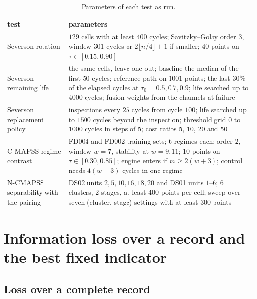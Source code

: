 \documentclass[12pt]{article}
\begin{document}
\begin{table}[tb]
\caption{Parameters of each test as run.}
\label{tab:params}
\centering
\footnotesize
\setlength{\tabcolsep}{3pt}
\begin{tabular}{@{}>{\raggedright\arraybackslash}p{}
                  >{\raggedright\arraybackslash}p{}@{}}
\hline
test & parameters\\
\hline
Severson rotation & $129$ cells with at least $400$ cycles; Savitzky--Golay
order $3$, window $301$ cycles or $2\lfloor n/4\rfloor+1$ if smaller; $40$
points on $\tau\in[0.15,0.90]$\\[2pt]
Severson remaining life & the same cells, leave-one-out; baseline the median
of the first $50$ cycles; reference path on $1001$ points; the last $30\%$ of
the elapsed cycles at $\tau_0=0.5,0.7,0.9$; life searched up to $4000$
cycles; fusion weights from the channels at failure\\[2pt]
Severson replacement policy & inspections every $25$ cycles from cycle $100$;
life searched up to $1500$ cycles beyond the inspection; threshold grid $0$
to $1000$ cycles in steps of $5$; cost ratios $5$, $10$, $20$ and $50$\\[2pt]
C-MAPSS regime contrast & FD004 and FD002 training sets; $6$ regimes each; order
$2$, window $w=7$, stability at $w=9,11$; $10$ points on
$\tau\in[0.30,0.85]$; engine enters if $m\ge2(w+3)$; control needs
$4(w+3)$ cycles in one regime\\[2pt]
N-CMAPSS separability with the pairing & DS02 units $2,5,10,16,18,20$ and DS01 units $1$--$6$;
$6$ clusters, $2$ stages, at least $400$ points per cell; sweep over seven
(cluster, stage) settings with at least $300$ points\\
\hline
\end{tabular}
\end{table}

\section{Information loss over a record and the best fixed indicator}
\label{sec:proofs}

\subsection{Loss over a complete record}
\end{document}
